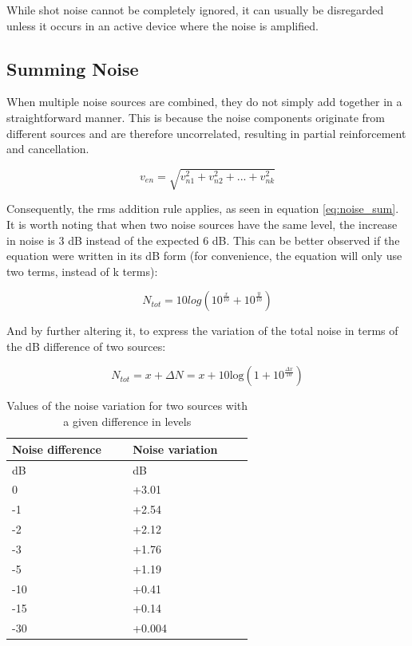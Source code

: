 While shot noise cannot be completely ignored, it can usually be disregarded
unless it occurs in an active device where the noise is amplified.

\subsection{Summing Noise}

When multiple noise sources are combined, they do not simply add together in a
straightforward manner. This is because the noise components originate from
different sources and are therefore uncorrelated, resulting in partial
reinforcement and cancellation.

\begin{equation}\label{eq:noise_sum}
    v_{en} = \sqrt{v_{n1}^2 + v_{n2}^2 + ... + v_{nk}^2}
\end{equation}

Consequently, the \ac{rms} addition rule applies, as seen in equation
\ref{eq:noise_sum}.
It is worth noting that when two noise sources have the same level, the
increase in noise is 3 dB instead of the expected 6 dB.
This can be better observed if the equation were written in its dB form (for
convenience, the equation will only use two terms, instead of k terms):

\begin{displaymath}
    N_{tot} = 10log(10^{\frac{x}{10}}+10^{\frac{y}{10}})
\end{displaymath}

And by further altering it, to express the variation of the total noise in
terms of the dB difference of two sources:

\begin{displaymath}
    N_{tot} = x + \Delta N = x + 10\text{log}(1+10^{\frac{\Delta x}{10}})
\end{displaymath}

\begin{table}[H]
    \center
    \begin{tabular}{
            m{0.3\linewidth}
            m{0.3\linewidth}
        }
        \hline\hline
        Noise difference & Noise variation\\
        \hline\hline
        dB & dB\\
        \hline
        0	& +3.01      \\
        -1	& +2.54      \\
        -2	& +2.12      \\
        -3	& +1.76      \\
        -5	& +1.19      \\
        -10	& +0.41      \\
        -15	& +0.14      \\
        -30	& +0.004     \\
       \hline\hline
    \end{tabular}
    \caption{Values of the noise variation for
             two sources with a given difference
             in levels
             }
    \label{table:noise_delta}
\end{table}

